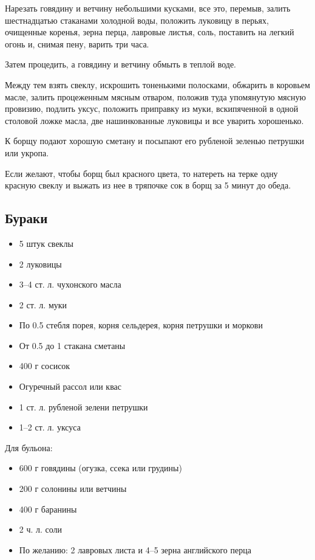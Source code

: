 Нарезать говядину и ветчину небольшими кусками, все это, перемыв, залить шестнадцатью стаканами холодной воды, положить луковицу в перьях, очищенные коренья, зерна перца, лавровые листья, соль, поставить на легкий огонь и, снимая пену, варить три часа.

Затем процедить, а говядину и ветчину обмыть в теплой воде.

Между тем взять свеклу, искрошить тоненькими полосками, обжарить в коровьем масле, залить процеженным мясным отваром, положив туда упомянутую мясную провизию, подлить уксус, положить приправку из муки, вскипяченной в одной столовой ложке масла, две нашинкованные луковицы и все уварить хорошенько.

К борщу подают хорошую сметану и посыпают его рубленой зеленью петрушки или укропа.

Если желают, чтобы борщ был красного цвета, то натереть на терке одну красную свеклу и выжать из нее в тряпочке сок в борщ за 5 минут до обеда.

\subsection{Бураки}\label{31buraki}

\begin{itemize}
	\item 5 штук свеклы 
	\item 2 луковицы 
	\item 3–4 ст. л. чухонского масла 
	\item 2 ст. л. муки 
	\item По 0.5 стебля порея, корня сельдерея, корня петрушки и моркови 
	\item От 0.5 до 1 стакана сметаны 
	\item 400 г сосисок 
	\item Огуречный рассол или квас 
	\item 1 ст. л. рубленой зелени петрушки 
	\item 1–2 ст. л. уксуса 
\end{itemize}
    
    Для бульона: 
\begin{itemize}
	\item 600 г говядины (огузка, ссека или грудины) 
	\item 200 г солонины или ветчины 
	\item 400 г баранины 
	\item 2 ч. л. соли 
	\item По желанию: 2 лавровых листа и 4–5 зерна английского перца
\end{itemize}

